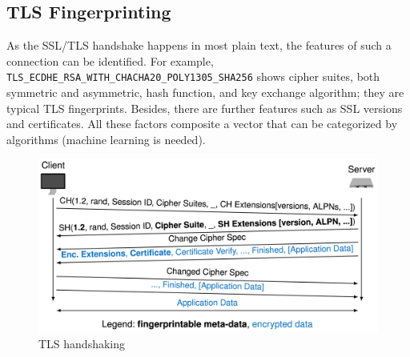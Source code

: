 \subsection{TLS Fingerprinting}
\begin{frame}
    
    \small
    As the SSL/TLS handshake happens in most plain text, the features of such a connection can be identified. For example, \texttt{TLS\_ECDHE\_RSA\_WITH\_CHACHA20\_POLY1305\_SHA256} shows cipher suites, both symmetric and asymmetric, hash function, and key exchange algorithm; they are typical TLS fingerprints. Besides, there are further features such as SSL versions and certificates. 
    All these factors composite a vector that can be categorized by algorithms (machine learning is needed).
    \begin{figure}
        \centering
        \includegraphics[scale=0.15]{pics/TLS_Handshake.png}
        \caption{\small TLS handshaking \cite{TLS_handshake}}
        \label{fig:fallback}
    \end{figure}
\end{frame}

